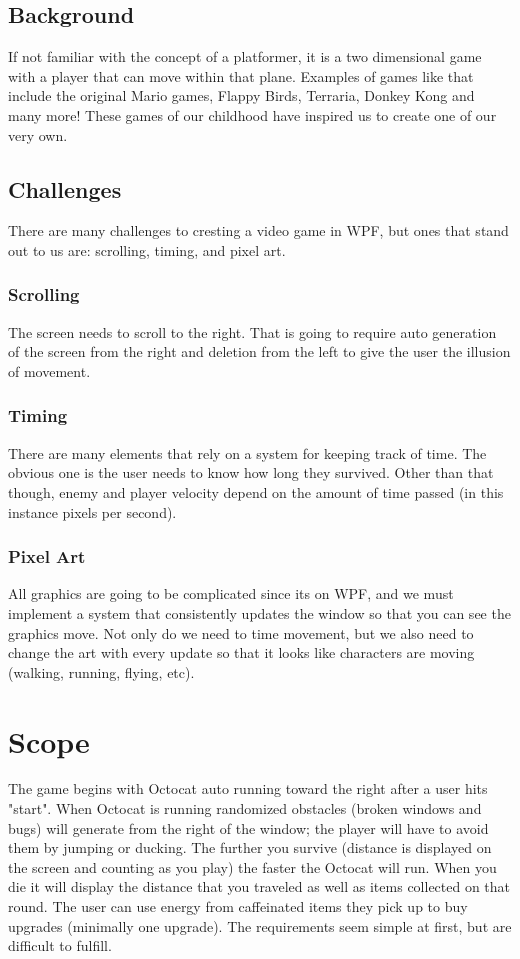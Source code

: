 \documentclass[10pt,conference,onecolumn,compsoc]{IEEEtran}
\begin{document}
\subsection{Background}
If not familiar with the concept of a platformer, it is a two dimensional game with a player that can move within that plane. Examples of games like that include the original Mario games, Flappy Birds, Terraria, Donkey Kong and many more! These games of our childhood have inspired us to create one of our very own.


\subsection{Challenges}
There are many challenges to cresting a video game in WPF, but ones that stand out to us are: scrolling, timing, and pixel art.

\subsubsection{Scrolling} The screen needs to scroll to the right. That is going to require auto generation of the screen from the right and deletion from the left to give the user the illusion of movement. 

\subsubsection{Timing}There are many elements that rely on a system for keeping track of time. The obvious one is the user needs to know how long they survived. Other than that though, enemy and player velocity depend on the amount of time passed (in this instance pixels per second).

\subsubsection{Pixel Art}All graphics are going to be complicated since its on WPF, and we must implement a system that consistently updates the window so that you can see the graphics move. Not only do we need to time movement, but we also need to change the art with every update so that it looks like characters are moving (walking, running, flying, etc).



\section{Scope}
The game begins with Octocat auto running toward the right after a user hits "start". When Octocat is running randomized obstacles (broken windows and bugs) will generate from the right of the window; the player will have to avoid them by jumping or ducking. The further you survive (distance is displayed on the screen and counting as you play) the faster the Octocat will run. When you die it will display the distance that you traveled as well as items collected on that round. The user can use energy from caffeinated items they pick up to buy upgrades (minimally one upgrade). The requirements seem simple at first, but are difficult to fulfill.
\end{document}

